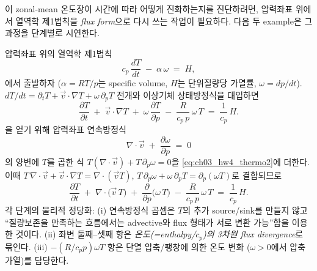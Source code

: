 이 zonal-mean 온도장이 시간에 따라 어떻게 진화하는지를 진단하려면, 압력좌표 위에서
열역학 제1법칙을 \emph{flux form}으로 다시 쓰는 작업이 필요하다.
다음 두 example은 그 과정을 단계별로 시연한다.

\begin{example}
\label{ex:ch03_hw4_fluxform}
압력좌표 위의 열역학 제1법칙
\begin{equation}
  c_{p}\,\frac{dT}{dt} \;-\; \alpha\,\omega \;=\; H,
  \label{eq:ch03_hw4_thermo1}
\end{equation}
에서 출발하자 ($\alpha = RT/p$는 specific volume, $H$는 단위질량당 가열률, $\omega = dp/dt$).
$dT/dt = \partial_{t}T + \vec v\cdot\nabla T + \omega\,\partial_{p}T$ 전개와 이상기체 상태방정식을 대입하면
\begin{equation}
  \frac{\partial T}{\partial t} \;+\; \vec v\cdot\nabla T \;+\; \omega\,\frac{\partial T}{\partial p}
       \;-\; \frac{R}{c_{p}\,p}\,\omega\,T \;=\; \frac{1}{c_{p}}\,H.
  \label{eq:ch03_hw4_thermo2}
\end{equation}
을 얻기 위해 압력좌표 연속방정식
\begin{equation}
  \nabla\!\cdot\vec v \;+\; \frac{\partial \omega}{\partial p} \;=\; 0
  \label{eq:ch03_hw4_cont}
\end{equation}
의 양변에 $T$를 곱한 식 $T(\nabla\!\cdot\vec v) + T\,\partial_{p}\omega = 0$을
\eqref{eq:ch03_hw4_thermo2}에 더한다.  이때
$T\,\nabla\!\cdot\vec v + \vec v\cdot\nabla T = \nabla\!\cdot(\vec v T)$,
$T\,\partial_{p}\omega + \omega\,\partial_{p}T = \partial_{p}(\omega T)$로 결합되므로
\begin{equation}
\boxed{\;
  \frac{\partial T}{\partial t}
     \;+\; \nabla\!\cdot\!\bigl(\vec v\,T\bigr)
     \;+\; \frac{\partial}{\partial p}\bigl(\omega\,T\bigr)
     \;-\; \frac{R}{c_{p}\,p}\,\omega\,T
     \;=\; \frac{1}{c_{p}}\,H.
\;}
  \label{eq:ch03_hw4_fluxform}
\end{equation}
각 단계의 물리적 정당화: (i) 연속방정식 곱셈은 $T$의 추가 source/sink를 만들지 않고
``질량보존을 만족하는 흐름에서는 advective와 flux 형태가 서로 변환 가능''함을 이용한 것이다.
(ii) 좌변 둘째--셋째 항은 \emph{온도(=enthalpy/$c_{p}$)의 3차원 flux divergence}로 묶인다.
(iii) $-(R/c_{p}p)\omega T$ 항은 단열 압축/팽창에 의한 온도 변화 ($\omega > 0$에서 압축 가열)를 담당한다.
\end{example}

